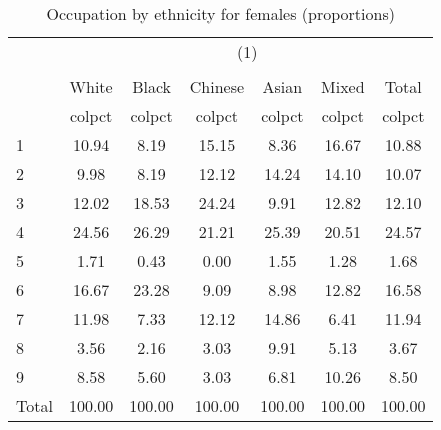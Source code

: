 \begin{table}[htbp]\centering
\def\sym#1{\ifmmode^{#1}\else\(^{#1}\)\fi}
\caption{Occupation by ethnicity for females (proportions)}
\begin{tabular}{l*{6}{c}}
\hline\hline
          &\multicolumn{6}{c}{(1)}                                    \\
          &\multicolumn{6}{c}{}                                       \\
          &    White&    Black&  Chinese&    Asian&    Mixed&    Total\\
          &   colpct&   colpct&   colpct&   colpct&   colpct&   colpct\\
\hline
1         &    10.94&     8.19&    15.15&     8.36&    16.67&    10.88\\
2         &     9.98&     8.19&    12.12&    14.24&    14.10&    10.07\\
3         &    12.02&    18.53&    24.24&     9.91&    12.82&    12.10\\
4         &    24.56&    26.29&    21.21&    25.39&    20.51&    24.57\\
5         &     1.71&     0.43&     0.00&     1.55&     1.28&     1.68\\
6         &    16.67&    23.28&     9.09&     8.98&    12.82&    16.58\\
7         &    11.98&     7.33&    12.12&    14.86&     6.41&    11.94\\
8         &     3.56&     2.16&     3.03&     9.91&     5.13&     3.67\\
9         &     8.58&     5.60&     3.03&     6.81&    10.26&     8.50\\
Total     &   100.00&   100.00&   100.00&   100.00&   100.00&   100.00\\
\hline\hline
\end{tabular}
\end{table}
